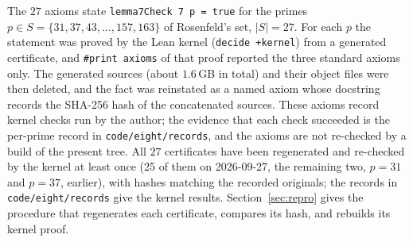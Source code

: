 \documentclass[11pt]{amsart}
\theoremstyle{plain}
\theoremstyle{definition}
\theoremstyle{remark}
\newcommand{\lean}[1]{{\def\_{\textunderscore\allowbreak}\def\.{.\allowbreak}\texttt{#1}}}
\begin{document}
The $27$ axioms state \lean{lemma7Check 7 p = true} for the primes
$p\in S=\{31,37,43,\dots,157,163\}$ of Rosenfeld's set, $|S|=27$. For each $p$ the statement was
proved by the Lean kernel (\lean{decide +kernel}) from a generated certificate, and \lean{\#print
axioms} of that proof reported the three standard axioms only. The generated sources (about
$1.6$\,GB in total) and their object files were then deleted, and the fact was reinstated as a
named axiom whose docstring records the SHA-256 hash of the concatenated sources. These axioms
record kernel checks run by the author; the evidence that each check succeeded is the per-prime record in \texttt{code/eight/records}, and the axioms are not re-checked by a build of the present tree. All $27$ certificates have
been regenerated and re-checked by the kernel at least once (25 of them on 2026-09-27, the
remaining two, $p=31$ and $p=37$, earlier), with hashes matching the recorded
originals; the records in \texttt{code/eight/records} give the kernel results. Section~\ref{sec:repro} gives the procedure that
regenerates each certificate, compares its hash, and rebuilds its kernel proof.
\end{document}

